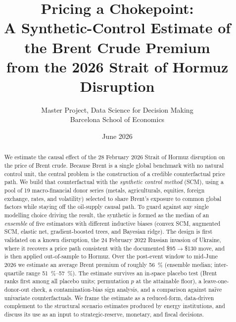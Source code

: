 \documentclass[11pt,a4paper]{article}
\title{\textbf{Pricing a Chokepoint:\\ A Synthetic-Control Estimate of the Brent Crude Premium\\ from the 2026 Strait of Hormuz Disruption}}
\author{Master Project, Data Science for Decision Making\\ Barcelona School of Economics}
\date{June 2026}
\begin{document}
\maketitle

\begin{abstract}
\noindent We estimate the causal effect of the 28 February 2026 Strait of Hormuz
disruption on the price of Brent crude. Because Brent is a single global benchmark
with no natural control unit, the central problem is the construction of a credible
counterfactual price path. We build that counterfactual with the \emph{synthetic
control method} (SCM), using a pool of 19 macro-financial donor series (metals,
agriculturals, equities, foreign exchange, rates, and volatility) selected to share
Brent's exposure to common global factors while staying off the oil-supply causal path. To
guard against any single modelling choice driving the result, the synthetic is
formed as the median of an \emph{ensemble} of five estimators with different inductive
biases (convex SCM, augmented SCM, elastic net, gradient-boosted trees, and Bayesian
ridge). The design is first validated on a known disruption, the 24 February 2022
Russian invasion of Ukraine, where it recovers a price path consistent with the
documented \$95$\to$\$130 move, and is then applied out-of-sample to Hormuz. Over the
post-event window to mid-June 2026 we estimate an average Brent premium of roughly
\SI{56}{\percent} (ensemble median; inter-quartile range \SIrange{51}{57}{\percent}).
The estimate survives an in-space placebo test (Brent ranks first among all placebo
units; permutation $p$ at the attainable floor), a leave-one-donor-out check, a
contamination-bias sign analysis, and a comparison against na\"ive univariate
counterfactuals. We frame the estimate as a reduced-form, data-driven complement to
the structural scenario estimates produced by energy institutions, and discuss its use
as an input to strategic-reserve, monetary, and fiscal decisions.
\end{abstract}

\tableofcontents
\newpage

\end{document}
